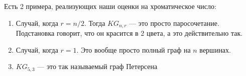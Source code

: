 \begin{example}
	Есть 2 примера, реализующих наши оценки на хроматическое число:
	\begin{enumerate}
		\item Случай, когда $r = n / 2$. Тогда $KG_{n, r}$ --- это просто паросочетание. Подстановка говорит, что он красится в 2 цвета, а это действительно так.
		
		\item Случай, когда $r = 1$. Это вообще просто полный граф на $n$ вершинах.
		
		\item $KG_{5, 3}$ --- это так называемый граф Петерсена
	\end{enumerate}
\end{example}